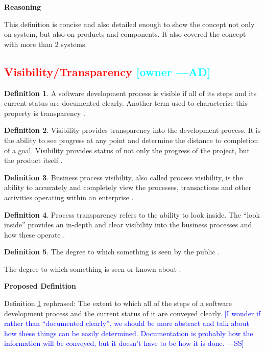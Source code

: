 \documentclass[letterpaper,cleveref]{lipics-v2019}
\newcommand{\authornote}[3]{\textcolor{#1}{[#3 ---#2]}}
\newcommand{\authornote}[3]{}
\newcommand{\wss}[1]{\authornote{blue}{SS}{#1}} %
\newcommand{\ad}[1]{\authornote{cyan}{AD}{#1}} %
\newcommand{\notdone}[1]{\textcolor{red}{#1}}
\theoremstyle{definition}
\newtheorem{defn}{Definition}
\begin{document}
\noindent \textbf{Reasoning}

This definition is concise and also detailed enough to show the concept not only
on system, but also on products and components. It also covered the concept with
more than 2 systems.

\subsection{\notdone{Visibility/Transparency} \ad{owner}}

\begin{defn}
  \label{VisibilitySelected}
  A software development process is visible if all of its steps and its current
  status are documented clearly. Another term used to characterize this property
  is transparency \citep{ghezzi1991fundamentals}.
\end{defn}

\begin{defn}
  Visibility provides transparency into the development process. It is the
  ability to see progress at any point and determine the distance to completion
  of a goal.  Visibility provides status of not only the progress of the
  project, but the product itself \citep{GSA2019}.
\end{defn}

\begin{defn}
  Business process visibility, also called process visibility, is the ability to
  accurately and completely view the processes, transactions and other
  activities operating within an enterprise \citep{Rouse2013}.
\end{defn}

\begin{defn}
  Process transparency refers to the ability to look inside. The “look inside”
  provides an in-depth and clear visibility into the business processes and how
  these operate \citep{PRIME2019}.
\end{defn}

\begin{defn}
The degree to which something is seen by the public
\citep{CambridgeVisibility2019}.
	
The degree to which something is seen or known about
\citep{CambridgeVisibility2019}.
\end{defn}

\noindent \textbf{Proposed Definition} 

Definition \ref{VisibilitySelected} rephrased: The extent to which all of the
steps of a software development process and the current status of it are 
conveyed clearly. \wss{I wonder if rather than
  ``documented clearly'', we should be more abstract and talk about how these
  things can be easily determined.  Documentation is probably how the
  information will be conveyed, but it doesn't have to be how it is done.}
\end{document}
